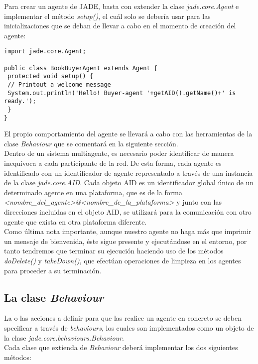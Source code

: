 Para crear un agente de JADE, basta con extender la clase \textit{jade.core.Agent} e implementar el método \textit{setup()}, el cuál solo se debería usar para las inicializaciones que se deban de llevar a cabo en el momento de creación del agente:
\begin{lstlisting}
import jade.core.Agent;

public class BookBuyerAgent extends Agent {
 protected void setup() {
 // Printout a welcome message
 System.out.println('Hello! Buyer-agent '+getAID().getName()+' is ready.');
 }
}
\end{lstlisting}

El propio comportamiento del agente se llevará a cabo con las herramientas de la clase \textit{Behaviour} que se comentará en la siguiente sección.\\

Dentro de un sistema multiagente, es necesario poder identificar de manera inequívoca a cada participante de la red. De esta forma, cada agente es identificado con un identificador de agente representado a través de una instancia de la clase \textit{jade.core.AID}. Cada objeto AID es un identificador global único de un determinado agente en una plataforma, que es de la forma \textit{<nombre\_del\_agente>@<nombre\_de\_la\_plataforma>} y junto con las direcciones incluidas en el objeto AID, se utilizará para la comunicación con otro agente que exista en otra plataforma diferente.\\

Como última nota importante, aunque nuestro agente no haga más que imprimir un mensaje de bienvenida, éste sigue presente y ejecutándose en el entorno, por tanto tendremos que terminar su ejecución haciendo uso de los métodos \textit{doDelete()} y \textit{takeDown()}, que efectúan operaciones de limpieza en los agentes para proceder a su terminación.

\subsection{La clase \textit{Behaviour}}

La o las acciones a definir para que las realice un agente en concreto se deben specificar a través de \textit{behaviours}, los cuales son implementados como un objeto de la clase \textit{jade.core.behaviours.Behaviour}.\\

Cada clase que extienda de \textit{Behaviour} deberá implementar los dos siguientes métodos:

